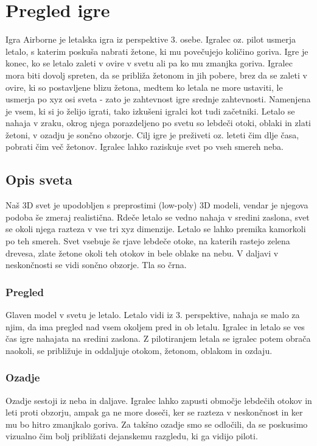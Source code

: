 \documentclass[a4paper]{article}
\begin{document}
\section{Pregled igre}%
Igra Airborne je letalska igra iz perspektive 3. osebe. Igralec oz. pilot usmerja letalo, s katerim poskuša nabrati žetone, ki mu povečujejo količino goriva. Igre je konec, ko se letalo zaleti v ovire v svetu ali pa ko mu zmanjka goriva. Igralec mora biti dovolj spreten, da se približa žetonom in jih pobere, brez da se zaleti v ovire, ki so postavljene blizu žetona, medtem ko letala ne more ustaviti, le usmerja po xyz osi sveta - zato je zahtevnost igre srednje zahtevnosti. Namenjena je vsem, ki si jo želijo igrati, tako izkušeni igralci kot tudi začetniki. Letalo se nahaja v zraku, okrog njega porazdeljeno po svetu so lebdeči otoki, oblaki in zlati žetoni, v ozadju je sončno obzorje. Cilj igre je preživeti oz. leteti čim dlje časa, pobrati čim več žetonov. Igralec lahko raziskuje svet po vseh smereh neba.

\subsection{Opis sveta}%
Naš 3D svet je upodobljen s preprostimi (low-poly) 3D modeli, vendar je njegova podoba še zmeraj realistična. Rdeče letalo se vedno nahaja v sredini zaslona, svet se okoli njega razteza v vse tri xyz dimenzije. Letalo se lahko premika kamorkoli po teh smereh. Svet vsebuje še rjave lebdeče otoke, na katerih rastejo zelena drevesa, zlate žetone okoli teh otokov in bele oblake na nebu. V daljavi v neskončnosti se vidi sončno obzorje. Tla so črna.

\subsubsection{Pregled}%
Glaven model v svetu je letalo. Letalo vidi iz 3. perspektive, nahaja se malo za njim, da ima pregled nad vsem okoljem pred in ob letalu. Igralec in letalo se ves čas igre nahajata na sredini zaslona. Z pilotiranjem letala se igralec potem obrača naokoli, se približuje in oddaljuje otokom, žetonom, oblakom in ozdaju. 

\subsubsection{Ozadje}%
Ozadje sestoji iz neba in daljave. Igralec lahko zapusti območje lebdečih otokov in leti proti obzorju, ampak ga ne more doseči, ker se razteza v neskončnost in ker mu bo hitro zmanjkalo goriva. Za takšno ozadje smo se odločili, da se poskusimo vizualno čim bolj približati dejanskemu razgledu, ki ga vidijo piloti.
\end{document}
